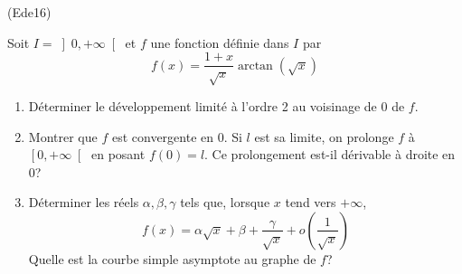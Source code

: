 \begin{tiny}(Ede16)\end{tiny} 
Soit $I=\left] 0,+\infty \right[ $ et $f$ une fonction d\'{e}finie dans $I$ par 
\begin{displaymath}
f(x)=\frac{1+x}{\sqrt{x}}\arctan (\sqrt{x}) 
\end{displaymath}

\begin{enumerate}
\item  D\'{e}terminer le d\'{e}veloppement limit\'{e} \`{a} l'ordre 2 au voisinage de 0 de $f$.

\item  Montrer que $f$ est convergente en 0. Si $l$ est sa limite, on prolonge $f$ \`{a} $\left[ 0,+\infty \right[ $ en posant $f(0)=l$. Ce prolongement est-il d\'{e}rivable \`{a} droite en 0?

\item  D\'{e}terminer les r\'{e}els $\alpha ,\beta ,\gamma $ tels que, lorsque $x$ tend vers $+\infty $,
\begin{displaymath}
f(x)=\alpha \sqrt{x}+\beta +\frac{\gamma }{\sqrt{x}}+o(\frac{1}{\sqrt{x}}) 
\end{displaymath}
Quelle est la courbe simple asymptote au graphe de $f$?
\end{enumerate}

